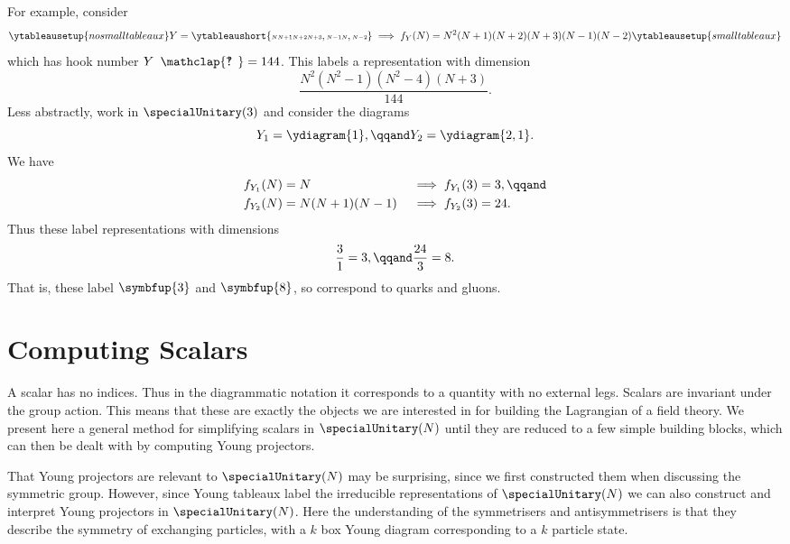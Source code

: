\documentclass[fleqn]{NotesClass}
\newcommand{\hooknumber}[1]{#1{\phantom{?}\mkern1mu\mathclap{\ooalign{\hfil ? \hfil \cr \hfil ! \hfil}}}}
\newcommand{\rep}[1]{\symbfup{#1}}
\begin{document}
    For example, consider
    \begin{equation}
        \ytableausetup{nosmalltableaux}
        Y = \ytableaushort{{\scriptscriptstyle N}{\scriptscriptstyle N+1}{\scriptscriptstyle N+2}{\scriptscriptstyle N+3},{\scriptscriptstyle N-1}{\scriptscriptstyle N},{\scriptscriptstyle N-2}} \implies f_Y(N) = N^2(N + 1)(N + 2)(N + 3)(N - 1)(N - 2)
        \ytableausetup{smalltableaux}
    \end{equation}
    which has hook number \(\hooknumber{Y} = 144\).
    This labels a representation with dimension
    \begin{equation}
        \frac{N^2(N^2 - 1)(N^2 - 4)(N + 3)}{144}.
    \end{equation}
    Less abstractly, work in \(\specialUnitary(3)\) and consider the diagrams
    \begin{equation}
        Y_1 = \ydiagram{1}, \qqand Y_2 = \ydiagram{2,1}.
    \end{equation}
    We have
    \begin{align}
        f_{Y_1}(N) &= N &&\implies f_{Y_1}(3) = 3, \qqand\\
        f_{Y_2}(N) &= N(N + 1)(N - 1) &&\implies f_{Y_2}(3) = 24.
    \end{align}
    Thus these label representations with dimensions
    \begin{equation}
        \frac{3}{1} = 3, \qqand \frac{24}{3} = 8.
    \end{equation}
    That is, these label \(\rep{3}\) and \(\rep{8}\), so correspond to quarks and gluons.
    
    \section{Computing Scalars}
    A scalar has no indices.
    Thus in the diagrammatic notation it corresponds to a quantity with no external legs.
    Scalars are invariant under the group action.
    This means that these are exactly the objects we are interested in for building the Lagrangian of a field theory.
    We present here a general method for simplifying scalars in \(\specialUnitary(N)\) until they are reduced to a few simple building blocks, which can then be dealt with by computing Young projectors.
    
    That Young projectors are relevant to \(\specialUnitary(N)\) may be surprising, since we first constructed them when discussing the symmetric group.
    However, since Young tableaux label the irreducible representations of \(\specialUnitary(N)\) we can also construct and interpret Young projectors in \(\specialUnitary(N)\).
    Here the understanding of the symmetrisers and antisymmetrisers is that they describe the symmetry of exchanging particles, with a \(k\) box Young diagram corresponding to a \(k\) particle state.
    
\end{document}
